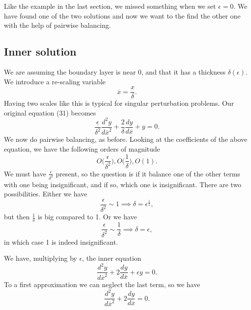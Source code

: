 \documentclass[12pt]{article}
\begin{document}
Like the example in the last section, we missed something when we set $\epsilon
= 0$. We have found one of the two solutions and now we want to the find the
other one with the help of pairwise balancing.

\subsection{Inner solution}

We are assuming the boundary layer is near 0, and that it has a thickness
$\delta(\epsilon)$. We introduce a re-scaling variable
\begin{equation}
\overline{x} = \frac{x}{\delta}.
\end{equation}
Having two scales like this is typical for singular perturbation problems. Our
original equation (31) becomes
\begin{equation}
\frac{\epsilon}{\delta^2} \frac{d^2y}{d\overline{x}^2} + \frac{2}{\delta}
\frac{dy}{d\overline{x}} + y = 0.
\end{equation}
We now do pairwise balancing, as before. Looking at the coefficients
of the above equation, we have the following orders of magnitude
\begin{equation}
O\Big(\frac{\epsilon}{\delta^2}\Big), O\Big(\frac{1}{\delta}\Big), O(1).
\end{equation}
We must have $\frac{\epsilon}{\delta^2}$ present, so the question is
if it balance one of the other terms with one being insignificant, and
if so, which one is insignificant. There are two possibilities. Either
we have
\begin{equation}
\frac{\epsilon}{\delta^2} \sim 1 \implies \delta = \epsilon^{\frac{1}{2}},
\end{equation}
but then $\frac{1}{\delta}$ is big compared to 1. Or we have
\begin{equation}
\frac{\epsilon}{\delta^2} \sim \frac{1}{\delta} \implies \delta = \epsilon,
\end{equation}
in which case 1 is indeed insignificant.

We have, multiplying by $\epsilon$, the inner equation
\begin{equation}
\frac{d^2 y}{d \overline{x}^2} + 2 \frac{dy}{d\overline{x}} + \epsilon
y = 0.
\end{equation}
To a first approximation we can neglect the last term, so we have
\begin{equation}
\frac{d^2 y}{d \overline{x}^2} + 2 \frac{dy}{d\overline{x}} = 0.
\end{equation}
\end{document}
